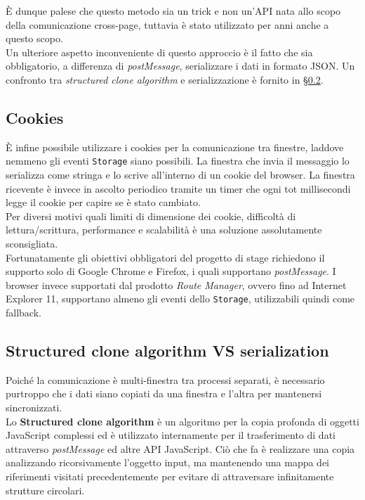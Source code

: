 È dunque palese che questo metodo sia un trick e non un'API nata allo scopo della comunicazione cross-page, tuttavia è stato utilizzato per anni anche a questo scopo. \\

Un ulteriore aspetto inconveniente di questo approccio è il fatto che sia obbligatorio, a differenza di \textit{postMessage}, serializzare i dati in formato \gls{JSON}. Un confronto tra \textit{structured clone algorithm} e serializzazione è fornito in §\ref{structured-clone}.

\subsection{Cookies}

È infine possibile utilizzare i \gls{cookies} per la comunicazione tra finestre, laddove nemmeno gli eventi \texttt{Storage} siano possibili. La finestra che invia il messaggio lo serializza come stringa e lo scrive all'interno di un cookie del browser. La finestra ricevente è invece in ascolto periodico tramite un timer che ogni tot millisecondi legge il cookie per capire se è stato cambiato. \\

Per diversi motivi quali limiti di dimensione dei cookie, difficoltà di lettura/scrittura, performance e scalabilità è una soluzione assolutamente sconsigliata. \\

Fortunatamente gli obiettivi obbligatori del progetto di stage richiedono il supporto solo di Google Chrome e Firefox, i quali supportano \textit{postMessage}. I browser invece supportati dal prodotto \textit{Route Manager}, ovvero fino ad Internet Explorer 11, supportano almeno gli eventi dello \texttt{Storage}, utilizzabili quindi come fallback.

\subsection{Structured clone algorithm VS serialization}\label{structured-clone}

Poiché la comunicazione è multi-finestra tra processi separati, è necessario purtroppo che i dati siano copiati da una finestra e l'altra per mantenersi sincronizzati. \\

Lo \textbf{Structured clone algorithm} è un algoritmo per la copia profonda di oggetti JavaScript complessi ed è utilizzato internamente per il trasferimento di dati attraverso \textit{postMessage} ed altre API JavaScript. Ciò che fa è realizzare una copia analizzando ricorsivamente l'oggetto input, ma mantenendo una mappa dei riferimenti visitati precedentemente per evitare di attraversare infinitamente strutture circolari. 

